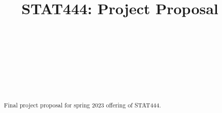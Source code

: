 \documentclass[aoas]{imsart}\usepackage[]{graphicx}\usepackage[]{xcolor}
\begin{document}

\begin{frontmatter}
\title{STAT444: Project Proposal}

\begin{aug}

\author[A]{~}
\author[B]{~}
\author[C]{~}
\author[D]{~}

\address[A]{Department of Statistics,
University of Waterloo}
\address[B]{Department of Statistics,
University of Waterloo}
\address[C]{Department of Statistics,
University of Waterloo}
\address[D]{Department of Statistics,
University of Waterloo}
\end{aug}

\begin{abstract}
Final project proposal for spring 2023 offering of STAT444.
\end{abstract}

\end{frontmatter}

\end{document}
